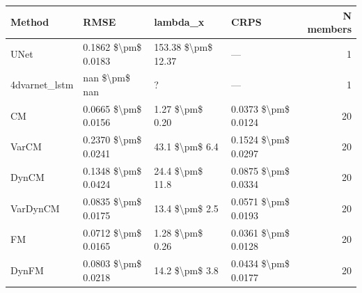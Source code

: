 \begin{tabular}{llllr}
\toprule
 Method        & RMSE                & lambda\_x           & CRPS                &   N members \\
\midrule
 UNet          & 0.1862 \$\textbackslash{}pm\$ 0.0183 & 153.38 \$\textbackslash{}pm\$ 12.37 & —                   &           1 \\
 4dvarnet\_lstm & nan \$\textbackslash{}pm\$ nan       & ?                  & —                   &           1 \\
 CM            & 0.0665 \$\textbackslash{}pm\$ 0.0156 & 1.27 \$\textbackslash{}pm\$ 0.20    & 0.0373 \$\textbackslash{}pm\$ 0.0124 &          20 \\
 VarCM         & 0.2370 \$\textbackslash{}pm\$ 0.0241 & 43.1 \$\textbackslash{}pm\$ 6.4     & 0.1524 \$\textbackslash{}pm\$ 0.0297 &          20 \\
 DynCM         & 0.1348 \$\textbackslash{}pm\$ 0.0424 & 24.4 \$\textbackslash{}pm\$ 11.8    & 0.0875 \$\textbackslash{}pm\$ 0.0334 &          20 \\
 VarDynCM      & 0.0835 \$\textbackslash{}pm\$ 0.0175 & 13.4 \$\textbackslash{}pm\$ 2.5     & 0.0571 \$\textbackslash{}pm\$ 0.0193 &          20 \\
 FM            & 0.0712 \$\textbackslash{}pm\$ 0.0165 & 1.28 \$\textbackslash{}pm\$ 0.26    & 0.0361 \$\textbackslash{}pm\$ 0.0128 &          20 \\
 DynFM         & 0.0803 \$\textbackslash{}pm\$ 0.0218 & 14.2 \$\textbackslash{}pm\$ 3.8     & 0.0434 \$\textbackslash{}pm\$ 0.0177 &          20 \\
\bottomrule
\end{tabular}
